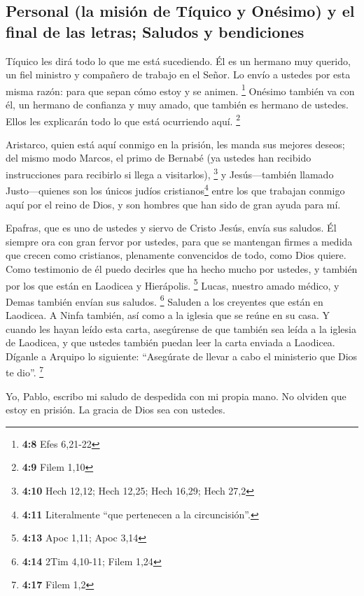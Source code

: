 \hypertarget{personal-la-misiuxf3n-de-tuxedquico-y-onuxe9simo-y-el-final-de-las-letras-saludos-y-bendiciones}{%
\subsection{Personal (la misión de Tíquico y Onésimo) y el final de las
letras; Saludos y
bendiciones}\label{personal-la-misiuxf3n-de-tuxedquico-y-onuxe9simo-y-el-final-de-las-letras-saludos-y-bendiciones}}

 Tíquico les dirá todo lo que me está sucediendo. Él es un
hermano muy querido, un fiel ministro y compañero de trabajo en el
Señor.  Lo envío a ustedes por esta misma razón: para que
sepan cómo estoy y se animen. \footnote{\textbf{4:8} Efes 6,21-22}
 Onésimo también va con él, un hermano de confianza y muy
amado, que también es hermano de ustedes. Ellos les explicarán todo lo
que está ocurriendo aquí. \footnote{\textbf{4:9} Filem 1,10}

 Aristarco, quien está aquí conmigo en la prisión, les
manda sus mejores deseos; del mismo modo Marcos, el primo de Bernabé (ya
ustedes han recibido instrucciones para recibirlo si llega a
visitarlos), \footnote{\textbf{4:10} Hech 12,12; Hech 12,25; Hech 16,29;
  Hech 27,2}  y Jesús---también llamado Justo---quienes
son los únicos judíos cristianos\footnote{\textbf{4:11} Literalmente
  ``que pertenecen a la circuncisión''.} entre los que trabajan conmigo
aquí por el reino de Dios, y son hombres que han sido de gran ayuda para
mí.

 Epafras, que es uno de ustedes y siervo de Cristo Jesús,
envía sus saludos. Él siempre ora con gran fervor por ustedes, para que
se mantengan firmes a medida que crecen como cristianos, plenamente
convencidos de todo, como Dios quiere.  Como testimonio
de él puedo decirles que ha hecho mucho por ustedes, y también por los
que están en Laodicea y Hierápolis. \footnote{\textbf{4:13} Apoc 1,11;
  Apoc 3,14}  Lucas, nuestro amado médico, y Demas
también envían sus saludos. \footnote{\textbf{4:14} 2Tim 4,10-11; Filem
  1,24}  Saluden a los creyentes que están en Laodicea. A
Ninfa también, así como a la iglesia que se reúne en su casa.
 Y cuando les hayan leído esta carta, asegúrense de que
también sea leída a la iglesia de Laodicea, y que ustedes también puedan
leer la carta enviada a Laodicea.  Díganle a Arquipo lo
siguiente: ``Asegúrate de llevar a cabo el ministerio que Dios te dio''.
\footnote{\textbf{4:17} Filem 1,2}

 Yo, Pablo, escribo mi saludo de despedida con mi propia
mano. No olviden que estoy en prisión. La gracia de Dios sea con
ustedes.
